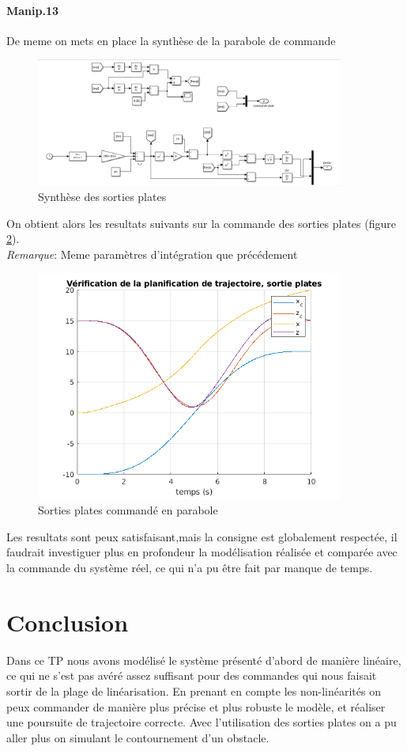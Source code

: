 \documentclass[10pt,a4paper,notitlepage]{article}
\begin{document}
\paragraph{Manip.13}
De meme on mets en place la synthèse de la parabole de commande
\begin{figure}[H]
  \centering
  \includegraphics[width=0.9\textwidth]{sortie_plate.png}
  \caption{Synthèse des sorties plates}
  \label{fig:label}
\end{figure}

On obtient alors les resultats suivants sur la commande des sorties
plates (figure \ref{fig:sortiesplates}).\\

\textit{Remarque}: Meme paramètres d'intégration que précédement
\begin{figure}[H]
  \centering
  \includegraphics[width=0.9\textwidth]{manip13e100.png}
  \caption{Sorties plates commandé en parabole}
  \label{fig:sortiesplates}
\end{figure}

Les resultats sont peux satisfaisant,mais la consigne est globalement
respectée, il faudrait investiguer plus en profondeur la modélisation
réalisée et comparée avec la commande du système réel, ce qui n'a pu
être fait par manque de temps.

\section*{Conclusion}
Dans ce TP nous avons modélisé le système présenté d'abord de manière
linéaire, ce qui ne s'est pas avéré assez suffisant pour des commandes
qui nous faisait sortir de la plage de linéarisation. En prenant en
compte les non-linéarités on peux commander de manière plus précise et
plus robuste le modèle, et réaliser une poursuite de trajectoire
correcte. Avec l'utilisation des sorties plates on a pu aller plus on
simulant le contournement d'un obstacle.
\end{document}
